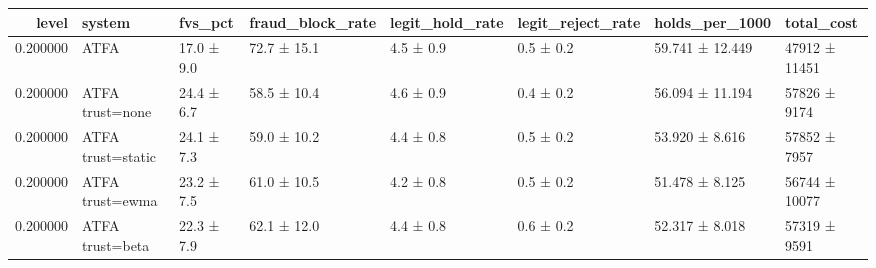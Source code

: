 \begin{tabular}{rlllllll}
\toprule
level & system & fvs\_pct & fraud\_block\_rate & legit\_hold\_rate & legit\_reject\_rate & holds\_per\_1000 & total\_cost \\
\midrule
0.200000 & ATFA & 17.0 ± 9.0 & 72.7 ± 15.1 & 4.5 ± 0.9 & 0.5 ± 0.2 & 59.741 ± 12.449 & 47912 ± 11451 \\
0.200000 & ATFA trust=none & 24.4 ± 6.7 & 58.5 ± 10.4 & 4.6 ± 0.9 & 0.4 ± 0.2 & 56.094 ± 11.194 & 57826 ± 9174 \\
0.200000 & ATFA trust=static & 24.1 ± 7.3 & 59.0 ± 10.2 & 4.4 ± 0.8 & 0.5 ± 0.2 & 53.920 ± 8.616 & 57852 ± 7957 \\
0.200000 & ATFA trust=ewma & 23.2 ± 7.5 & 61.0 ± 10.5 & 4.2 ± 0.8 & 0.5 ± 0.2 & 51.478 ± 8.125 & 56744 ± 10077 \\
0.200000 & ATFA trust=beta & 22.3 ± 7.9 & 62.1 ± 12.0 & 4.4 ± 0.8 & 0.6 ± 0.2 & 52.317 ± 8.018 & 57319 ± 9591 \\
\bottomrule
\end{tabular}
